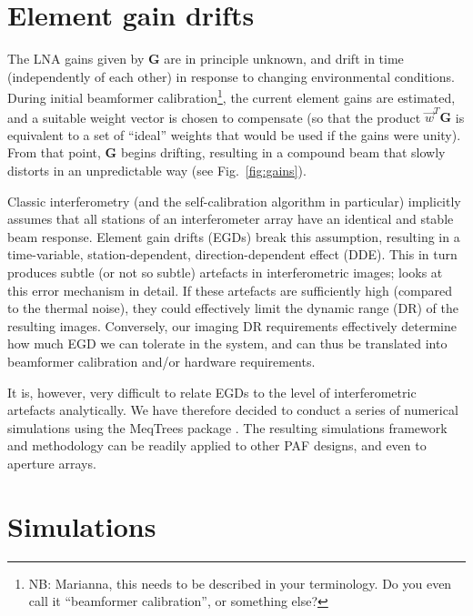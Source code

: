 \documentclass[10pt]{article}
\begin{document}
\section{Element gain drifts}

The LNA gains given by $\mathbf{G}$ are in principle unknown, and drift in time (independently of each other) in response to changing environmental conditions. During initial beamformer calibration\footnote{NB: Marianna, this needs to be described in your terminology. Do you even call it ``beamformer calibration'', or something else?}, the current element gains are estimated, and a suitable weight vector is chosen to compensate (so that the product $\vec w^T\mathbf{G}$ is equivalent to a set of ``ideal'' weights that would be used if the gains were unity). From that point, $\mathbf{G}$ begins drifting, resulting in a compound beam that slowly distorts in an unpredictable way (see Fig.~\ref{fig:gains}). 

Classic interferometry (and the self-calibration algorithm in particular) implicitly assumes that all stations of an interferometer array have an identical and stable beam response. Element gain drifts (EGDs) break this assumption, resulting in a time-variable, station-dependent, direction-dependent effect (DDE). This in turn produces subtle (or not so subtle) artefacts in interferometric images; \citet{RRIME2} looks at this error mechanism in detail. If these artefacts are sufficiently high (compared to the thermal noise), they could effectively limit the dynamic range
(DR) of the resulting images. Conversely, our imaging DR requirements effectively determine how much EGD we can tolerate in the system, and can thus be translated into beamformer calibration and/or hardware requirements.

It is, however, very difficult to relate EGDs to the level of interferometric artefacts analytically. We have therefore decided to conduct a series of numerical simulations using the MeqTrees package \citep{meqtrees}. The resulting simulations framework and methodology
can be readily applied to other PAF designs, and even to aperture arrays.

\section{Simulations}
\end{document}
